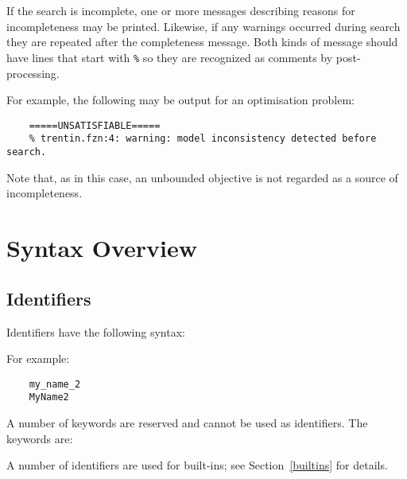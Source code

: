 \documentclass[10pt]{scrartcl}
\begin{document}
\begin{productions}
\RuleWarnings \\
\\
\RuleMessage
\end{productions}

\noindent
If the search is incomplete,
one or more messages describing reasons for incompleteness may be printed.
Likewise, if any warnings occurred during search
they are repeated after the completeness message.
Both kinds of message should have lines that start with \texttt{\%}
so they are recognized as comments by post-processing.

For example, the following may be output for an optimisation problem:

\begin{verbatim}
    =====UNSATISFIABLE=====
    % trentin.fzn:4: warning: model inconsistency detected before search.
\end{verbatim}

\noindent
Note that, as in this case,
an unbounded objective is not regarded as a source of incompleteness.


\section{Syntax Overview}
  \label{Syntax Overview}

\subsection{Identifiers}
     \label{Identifiers}
Identifiers have the following syntax:
\begin{productions}
    \RuleIdent
\end{productions}
For example:
\begin{verbatim}
    my_name_2
    MyName2
\end{verbatim}
A number of keywords are reserved and cannot be used as identifiers.  The
keywords are:
\reservedKeywords{}

A number of identifiers are used for built-ins;  see Section~\ref{builtins}
for details.
\end{document}
